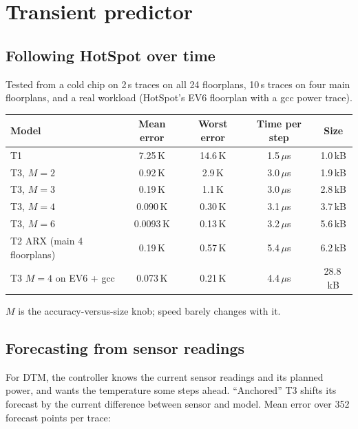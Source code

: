 \documentclass[11pt,a4paper]{article}
\newcommand{\us}{\,$\mu$s}
\begin{document}
\section{Transient predictor}

\subsection{Following HotSpot over time}
Tested from a cold chip on 2\,s traces on all 24 floorplans, 10\,s traces on four main floorplans,
and a real workload (HotSpot's EV6 floorplan with a gcc power trace).

\begin{center}
\small
\begin{tabular}{@{}l c c c c@{}}
\toprule
Model & Mean error & Worst error & Time per step & Size \\
\midrule
T1 & 7.25\,K & 14.6\,K & 1.5\us & 1.0\,kB \\
T3, $M=2$ & 0.92\,K & 2.9\,K & 3.0\us & 1.9\,kB \\
T3, $M=3$ & 0.19\,K & 1.1\,K & 3.0\us & 2.8\,kB \\
T3, $M=4$ & 0.090\,K & 0.30\,K & 3.1\us & 3.7\,kB \\
T3, $M=6$ & 0.0093\,K & 0.13\,K & 3.2\us & 5.6\,kB \\
T2 ARX (main 4 floorplans) & 0.19\,K & 0.57\,K & 5.4\us & 6.2\,kB \\
T3 $M=4$ on EV6 + gcc & 0.073\,K & 0.21\,K & 4.4\us & 28.8\,kB \\
\bottomrule
\end{tabular}
\end{center}
$M$ is the accuracy-versus-size knob; speed barely changes with it.

\subsection{Forecasting from sensor readings}
For DTM, the controller knows the current sensor readings and its planned power, and wants the
temperature some steps ahead. ``Anchored'' T3 shifts its forecast by the current difference
between sensor and model. Mean error over 352 forecast points per trace:
\end{document}
